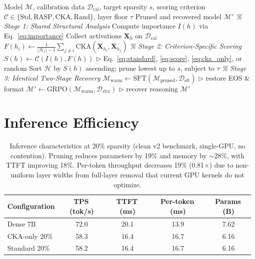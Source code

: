\begin{algorithm}[h]
\caption{Controlled Pruning Comparison Framework}
\label{alg:rasp}
\begin{algorithmic}[1]
\Require Model $\mathcal{M}$, calibration data $\mathcal{D}_\text{cal}$, target sparsity $s$, scoring criterion $\mathcal{C} \in \{\text{Std}, \text{RASP}, \text{CKA}, \text{Rand}\}$, layer floor $\tau$
\Ensure Pruned and recovered model $\mathcal{M}'$
\Statex \textit{\% Stage 1: Shared Structural Analysis}
    \State Compute importance $I(h)$ via Eq.~\eqref{eq:importance}
    \State Collect activations $\mathbf{X}_h$ on $\mathcal{D}_\text{cal}$
\EndFor
{}
        \State $F(h_i) \gets \frac{1}{|\mathcal{H}_\ell|-1} \sum_{j \neq i} \text{CKA}(\mathbf{X}_{h_i}, \mathbf{X}_{h_j})$
    \EndFor
\EndFor
\Statex \textit{\% Stage 2: Criterion-Specific Scoring}
    \State $S(h) \gets \mathcal{C}(I(h), F(h))$ \hfill $\triangleright$ Eq.~\ref{eq:standard}, \ref{eq:score}, \ref{eq:cka_only}, or random
\EndFor
\State Sort $\mathcal{H}$ by $S(h)$ ascending; prune lowest up to $s$, subject to $\tau$
\Statex \textit{\% Stage 3: Identical Two-Stage Recovery}
\State $\mathcal{M}_\text{warm} \gets \text{SFT}(\mathcal{M}_\text{pruned}, \mathcal{D}_\text{sft})$ \hfill $\triangleright$ restore EOS \& format
\State $\mathcal{M}' \gets \text{GRPO}(\mathcal{M}_\text{warm}, \mathcal{D}_\text{rlvr})$ \hfill $\triangleright$ recover reasoning
\State \Return $\mathcal{M}'$
\end{algorithmic}
\end{algorithm}

\section{Inference Efficiency}
\label{sec:appendix_inference}

\begin{table}[h]
\centering
\small
\caption{Inference characteristics at 20\% sparsity (clean v2 benchmark, single-GPU, no contention). Pruning reduces parameters by 19\% and memory by ${\sim}$28\%, with TTFT improving 18\%. Per-token throughput decreases 19\% (0.81$\times$) due to non-uniform layer widths from full-layer removal that current GPU kernels do not optimize.}
\label{tab:inference}
\begin{tabular}{@{}lcccc@{}}
\toprule
Configuration & TPS\,(tok/s) & TTFT\,(ms) & Per-token\,(ms) & Params\,(B) \\
\midrule
Dense 7B & 72.0 & 20.1 & 13.9 & 7.62 \\
CKA-only 20\% & 58.3 & 16.4 & 16.7 & 6.16 \\
Standard 20\% & 58.2 & 16.4 & 16.7 & 6.16 \\
\bottomrule
\end{tabular}
\end{table}

